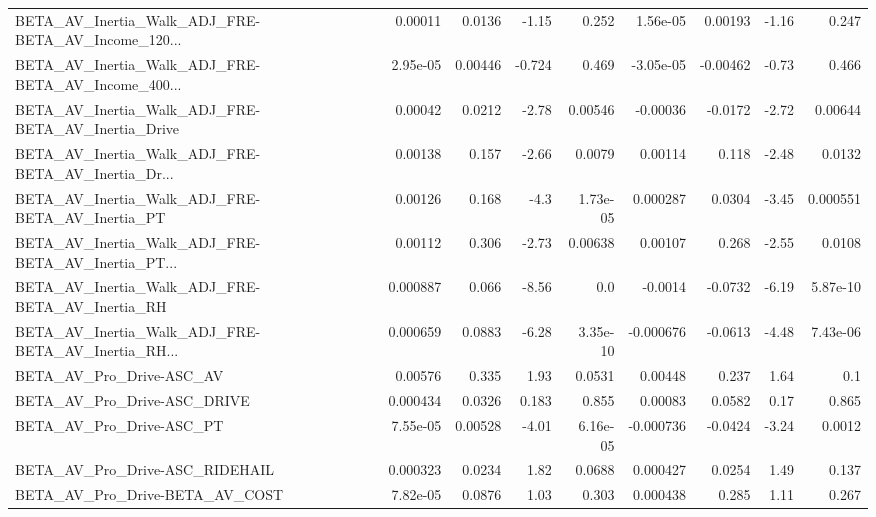 \begin{tabular}{lrrrrrrrr}
BETA\_AV\_Inertia\_Walk\_ADJ\_FRE-BETA\_AV\_Income\_120... &     0.00011 &       0.0136 &    -1.15 &    0.252 &   1.56e-05 &     0.00193 &        -1.16 &         0.247 \\
BETA\_AV\_Inertia\_Walk\_ADJ\_FRE-BETA\_AV\_Income\_400... &    2.95e-05 &      0.00446 &   -0.724 &    0.469 &  -3.05e-05 &    -0.00462 &        -0.73 &         0.466 \\
BETA\_AV\_Inertia\_Walk\_ADJ\_FRE-BETA\_AV\_Inertia\_Drive &     0.00042 &       0.0212 &    -2.78 &  0.00546 &   -0.00036 &     -0.0172 &        -2.72 &       0.00644 \\
BETA\_AV\_Inertia\_Walk\_ADJ\_FRE-BETA\_AV\_Inertia\_Dr... &     0.00138 &        0.157 &    -2.66 &   0.0079 &    0.00114 &       0.118 &        -2.48 &        0.0132 \\
BETA\_AV\_Inertia\_Walk\_ADJ\_FRE-BETA\_AV\_Inertia\_PT    &     0.00126 &        0.168 &     -4.3 & 1.73e-05 &   0.000287 &      0.0304 &        -3.45 &      0.000551 \\
BETA\_AV\_Inertia\_Walk\_ADJ\_FRE-BETA\_AV\_Inertia\_PT... &     0.00112 &        0.306 &    -2.73 &  0.00638 &    0.00107 &       0.268 &        -2.55 &        0.0108 \\
BETA\_AV\_Inertia\_Walk\_ADJ\_FRE-BETA\_AV\_Inertia\_RH    &    0.000887 &        0.066 &    -8.56 &      0.0 &    -0.0014 &     -0.0732 &        -6.19 &      5.87e-10 \\
BETA\_AV\_Inertia\_Walk\_ADJ\_FRE-BETA\_AV\_Inertia\_RH... &    0.000659 &       0.0883 &    -6.28 & 3.35e-10 &  -0.000676 &     -0.0613 &        -4.48 &      7.43e-06 \\
BETA\_AV\_Pro\_Drive-ASC\_AV                           &     0.00576 &        0.335 &     1.93 &   0.0531 &    0.00448 &       0.237 &         1.64 &           0.1 \\
BETA\_AV\_Pro\_Drive-ASC\_DRIVE                        &    0.000434 &       0.0326 &    0.183 &    0.855 &    0.00083 &      0.0582 &         0.17 &         0.865 \\
BETA\_AV\_Pro\_Drive-ASC\_PT                           &    7.55e-05 &      0.00528 &    -4.01 & 6.16e-05 &  -0.000736 &     -0.0424 &        -3.24 &        0.0012 \\
BETA\_AV\_Pro\_Drive-ASC\_RIDEHAIL                     &    0.000323 &       0.0234 &     1.82 &   0.0688 &   0.000427 &      0.0254 &         1.49 &         0.137 \\
BETA\_AV\_Pro\_Drive-BETA\_AV\_COST                     &    7.82e-05 &       0.0876 &     1.03 &    0.303 &   0.000438 &       0.285 &         1.11 &         0.267 \\

\end{tabular}
